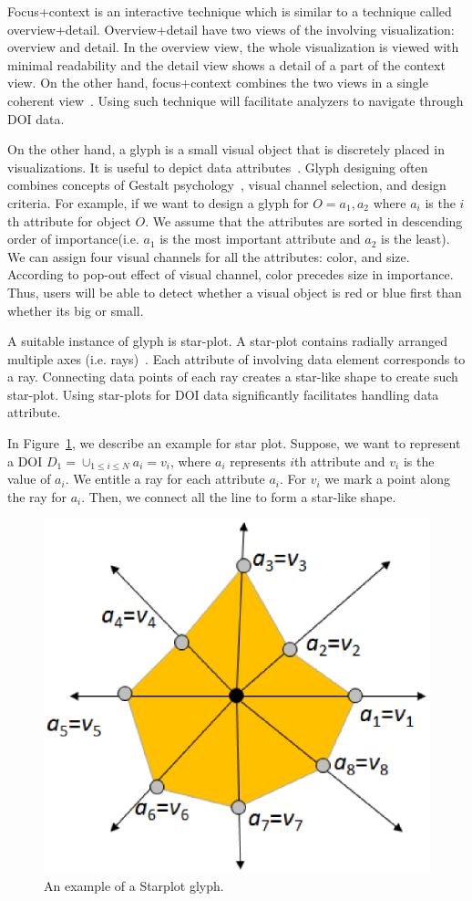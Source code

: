 Focus+context is an interactive technique which is similar to a technique called overview+detail. Overview+detail have two views of the involving visualization: overview and detail. In the overview view, the whole visualization is viewed with minimal readability and the detail view shows a detail of a part of the context view. On the other hand, focus+context combines the two views in a single coherent view~\cite{spence1982data}. Using such technique will facilitate analyzers to navigate through DOI data. 

On the other hand, a glyph is a small visual object that is discretely placed in visualizations. It is useful to depict data attributes~\cite{borgo2013glyph}. Glyph designing often combines concepts of Gestalt psychology~\cite{kohler1970gestalt}, visual channel selection, and design criteria. For example, if we want to design a glyph for $O = {a_1, a_2}$ where $a_i$ is the $i$th attribute for object $O$. We assume that the attributes are sorted in descending order of importance(i.e. $a_1$ is the most important attribute and $a_2$ is the least). We can assign four visual channels for all the attributes: color, and size. According to pop-out effect of visual channel, color precedes size in importance. Thus, users will be able to detect whether a visual object is red or blue first than whether its big or small. 

A suitable instance of glyph is star-plot. A star-plot contains radially arranged multiple axes (i.e. rays)~\cite{klippel2009star}. Each attribute of involving data element corresponds to a ray. Connecting data points of each ray creates a star-like shape to create such star-plot. Using star-plots for DOI data significantly facilitates handling data attribute. 

In Figure~\ref{fig:StarplotExample}, we describe an example for star plot. Suppose, we want to represent a DOI $D_1=\cup_{1 \leq i \leq N}a_i=v_i $, where $a_i$ represents $i$th attribute and $v_i$ is the value of $a_i$. We entitle a ray for each attribute $a_i$. For $v_i$ we mark a point along the ray for $a_i$. Then, we connect all the line to form a star-like shape.  
\begin{figure}[htbp]
  \centering
  \includegraphics[width=0.5\linewidth]{images/StarplotExample.eps}
  \caption{An example of a Starplot glyph. }
	\label{fig:StarplotExample}
\end{figure}

